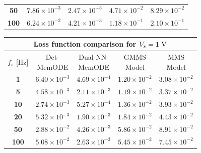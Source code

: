 \documentclass[lettersize,journal]{IEEEtran}
\begin{document}
\begin{table}
\begin{tabular}{c|cccc}
    \textbf{50}  & \(7.86 \times 10^{-3}\) & \color{ieeegreen} \bfseries \(2.47 \times 10^{-3}\) & \(4.71 \times 10^{-2}\) & \color{ieeered} \bfseries \(8.29 \times 10^{-2}\) \\
    \textbf{100} & \(6.24 \times 10^{-2}\) & \color{ieeegreen} \bfseries \(4.21 \times 10^{-3}\) & \(1.18 \times 10^{-1}\) & \color{ieeered} \bfseries \(2.10 \times 10^{-1}\) \\
    \bottomrule
  \end{tabular}
  \begin{tabular}{c|cccc}
    \toprule
    \multicolumn{5}{c}{\textbf{Loss function comparison for \(V_s = 1 \rm \ V\)}}                                                                                          \\
    \midrule
    \(f_s\) [Hz] & \makecell{Det-                                                                                                                                          \\MemODE}             & \makecell{Dual-NN-                                                                                                             \\ MemODE}                 & \makecell{GMMS\\Model}             & \makecell{MMS\\Model}                                        \\
    \midrule
    \textbf{1}   & \(6.40 \times 10^{-3}\) & \color{ieeegreen} \bfseries \(4.69 \times 10^{-4}\) & \(1.20 \times 10^{-2}\) & \color{ieeered} \bfseries \(3.08 \times 10^{-2}\) \\
    \textbf{5}   & \(4.58 \times 10^{-3}\) & \color{ieeegreen} \bfseries \(2.11 \times 10^{-3}\) & \(1.19 \times 10^{-2}\) & \color{ieeered} \bfseries \(3.37 \times 10^{-2}\) \\
    \textbf{10}  & \(2.74 \times 10^{-3}\) & \color{ieeegreen} \bfseries \(5.27 \times 10^{-4}\) & \(1.36 \times 10^{-2}\) & \color{ieeered} \bfseries \(3.93 \times 10^{-2}\) \\
    \textbf{20}  & \(5.32 \times 10^{-3}\) & \color{ieeegreen} \bfseries \(1.90 \times 10^{-3}\) & \(1.84 \times 10^{-2}\) & \color{ieeered} \bfseries \(4.43 \times 10^{-2}\) \\
    \textbf{50}  & \(2.88 \times 10^{-2}\) & \color{ieeegreen} \bfseries \(4.26 \times 10^{-3}\) & \(5.86 \times 10^{-2}\) & \color{ieeered} \bfseries \(8.91 \times 10^{-2}\) \\
    \textbf{100} & \(5.08 \times 10^{-2}\) & \color{ieeegreen} \bfseries \(2.63 \times 10^{-3}\) & \(5.45 \times 10^{-2}\) & \color{ieeered} \bfseries \(7.45 \times 10^{-2}\) \\

\end{tabular}
\end{table}
\end{document}
